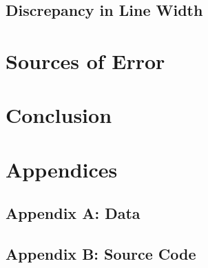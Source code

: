 \documentclass[a4paper]{article}
\begin{document}
\subsection{Discrepancy in Line Width}
\qq 

\section{Sources of Error}
\qq 

\section{Conclusion}
\qq 

\section{Appendices}

\subsection{Appendix A: Data}

\subsection{Appendix B: Source Code}
\end{document}
